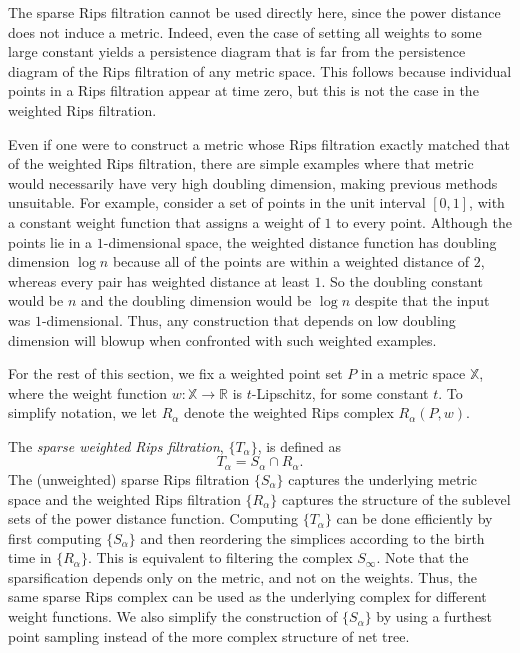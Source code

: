 \documentclass[a4paper]{article}
\newcommand\X{\mathbb{X}}
\newcommand\R{\mathbb{R}}
\begin{document}
The sparse Rips filtration cannot be used directly here, since the power distance does not induce a metric.
Indeed, even the case of setting all weights to some large constant yields a persistence diagram that is far from the persistence diagram of the Rips filtration of any metric space.
This follows because individual points in a Rips filtration appear at time zero, but this is not the case in the weighted Rips filtration.

Even if one were to construct a metric whose Rips filtration exactly matched that of the weighted Rips filtration, there are simple examples where that metric would necessarily have very high doubling dimension, making previous methods unsuitable.
For example, consider a set of points in the unit interval $[0,1]$, with a constant weight function that assigns a weight of $1$ to every point.
Although the points lie in a $1$-dimensional space, the weighted distance function has doubling dimension $\log n$ because all of the points are within a weighted distance of $2$, whereas every pair has weighted distance at least $1$.
So the doubling constant would be $n$ and the doubling dimension would be $\log n$ despite that the input was $1$-dimensional.
Thus, any construction that depends on low doubling dimension will blowup when confronted with such weighted examples.





For the rest of this section, we fix a weighted point set $P$ in a metric space $\X$, where the weight function $w:\X\to\R$ is $t$-Lipschitz, for some constant $t$.
To simplify notation, we let $R_\alpha$ denote the weighted Rips complex $R_\alpha(P,w)$.


The \emph{sparse weighted Rips filtration}, $\{T_\alpha\}$, is defined as
\[
  T_\alpha = S_\alpha \cap R_\alpha.
\]
The (unweighted) sparse Rips filtration $\{S_\alpha\}$ captures the underlying metric space and the weighted Rips filtration $\{R_\alpha\}$ captures the structure of the sublevel sets of the power distance function.
Computing $\{T_\alpha\}$ can be done efficiently by first computing $\{S_\alpha\}$ and then reordering the simplices according to the birth time in $\{R_\alpha\}$.
This is equivalent to filtering the complex $S_\infty$.
Note that the sparsification depends only on the metric, and not on the weights.
Thus, the same sparse Rips complex can be used as the underlying complex for different weight functions.
We also simplify the construction of $\{S_\alpha\}$ by using a furthest point sampling instead of the more complex structure of net tree.
\end{document}
